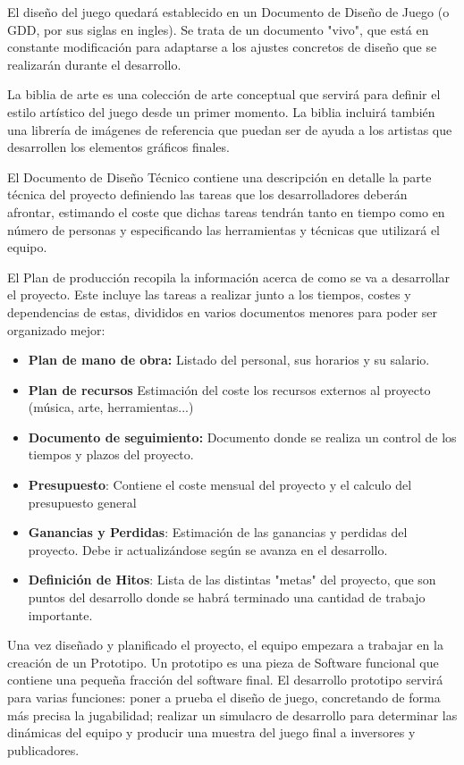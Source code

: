 El diseño del juego quedará establecido en un Documento de Diseño de Juego (o GDD, por sus siglas en ingles). Se trata de un documento "vivo", que está en constante modificación para adaptarse a los ajustes concretos de diseño que se realizarán durante el desarrollo.

La biblia de arte es una colección de arte conceptual que servirá para definir el estilo artístico del juego desde un primer momento. La biblia incluirá también una librería de imágenes de referencia que puedan ser de ayuda a los artistas que desarrollen los elementos gráficos finales.

El Documento de Diseño Técnico contiene una descripción en detalle la parte técnica del proyecto definiendo las tareas que los desarrolladores deberán afrontar, estimando el coste que dichas tareas tendrán tanto en tiempo como en número de personas y especificando las herramientas y técnicas que utilizará el equipo.

El Plan de producción recopila la información acerca de como se va a desarrollar el proyecto. Este incluye las tareas a realizar junto a los tiempos, costes y dependencias de estas, divididos en varios documentos menores para poder ser organizado mejor:
\begin{itemize}
\item \textbf{Plan de mano de obra:} Listado del personal, sus horarios y su salario.
\item \textbf{Plan de recursos} Estimación del coste los recursos externos al proyecto (música, arte, herramientas...)
\item \textbf{Documento de seguimiento:} Documento donde se realiza un control de los tiempos y plazos del proyecto.
\item \textbf{Presupuesto}: Contiene el coste mensual del proyecto y el calculo del presupuesto general
\item \textbf{Ganancias y Perdidas}: Estimación  de las ganancias y  perdidas del proyecto. Debe ir actualizándose según se avanza en el desarrollo.
\item \textbf{Definición de Hitos}: Lista de las distintas "metas" del proyecto, que son puntos del desarrollo donde se habrá terminado una cantidad de trabajo importante.
\end{itemize}

Una vez diseñado y planificado el proyecto, el equipo empezara a trabajar en la creación de un Prototipo. Un prototipo es una pieza de Software funcional que contiene una pequeña fracción del software final. El desarrollo prototipo servirá para varias funciones: poner a prueba el diseño de juego, concretando de forma más precisa la jugabilidad; realizar un simulacro de desarrollo para determinar las dinámicas del equipo y producir una muestra del juego final a inversores y publicadores.

